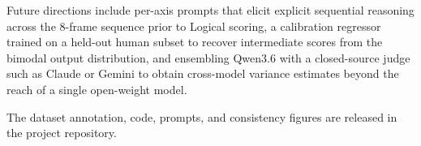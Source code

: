 \documentclass[letterpaper]{article}
\begin{document}
Future directions include per-axis prompts that elicit explicit
sequential reasoning across the 8-frame sequence prior to Logical
scoring, a calibration regressor trained on a held-out human subset
to recover intermediate scores from the bimodal output distribution,
and ensembling Qwen3.6 with a closed-source judge such as Claude or
Gemini to obtain cross-model variance estimates beyond the reach of
a single open-weight model.

The dataset annotation, code, prompts, and consistency figures are
released in the project repository.


\end{document}

